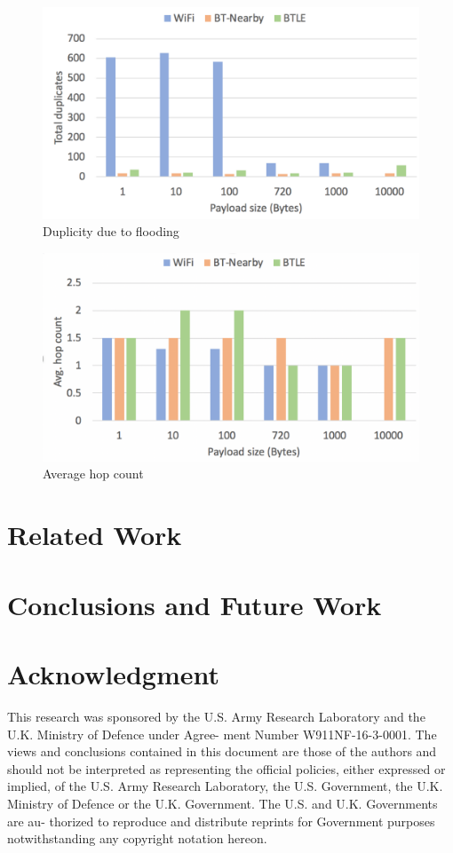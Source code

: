 \documentclass[conference]{IEEEtran}
\begin{document}
\begin{figure}[htbp]
\centerline{\includegraphics[width=\columnwidth]{figs/duplicates}}
\caption{Duplicity due to flooding}
\label{fig:dup}
\end{figure}

\begin{figure}[htbp]
\centerline{\includegraphics[width=\columnwidth]{figs/hops}}
\caption{Average hop count}
\label{fig:hop}
\end{figure}

\section{Related Work}
\label{sec:related}

\section{Conclusions and Future Work}
\label{sec:conclude}

\section*{Acknowledgment}
This research was sponsored by the U.S. Army Research Laboratory and
the U.K. Ministry of Defence under Agree- ment Number
W911NF-16-3-0001. The views and conclusions contained in this document
are those of the authors and should not be interpreted as representing
the official policies, either expressed or implied, of the U.S. Army
Research Laboratory, the U.S. Government, the U.K. Ministry of Defence
or the U.K. Government. The U.S. and U.K. Governments are au- thorized
to reproduce and distribute reprints for Government purposes
notwithstanding any copyright notation hereon.
 
\end{document}
